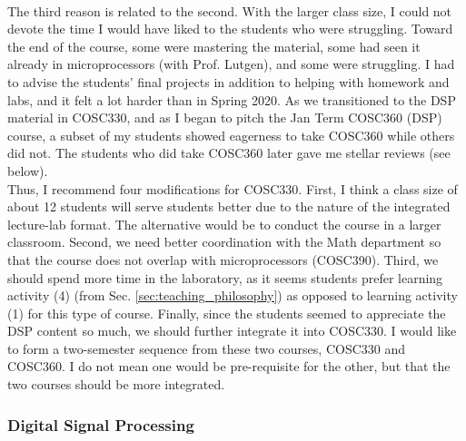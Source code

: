 \documentclass[../../main.tex]{subfiles}
\begin{document}
\\
\vspace{0.15cm}
The third reason is related to the second.  With the larger class size, I could not devote the time I would have liked to the students who were struggling.  Toward the end of the course, some were mastering the material, some had seen it already in microprocessors (with Prof. Lutgen), and some were struggling.  I had to advise the students' final projects in addition to helping with homework and labs, and it felt a lot harder than in Spring 2020.  As we transitioned to the DSP material in COSC330, and as I began to pitch the Jan Term COSC360 (DSP) course, a subset of my students showed eagerness to take COSC360 while others did not.  The students who did take COSC360 later gave me stellar reviews (see below).
\\
\vspace{0.15cm}
Thus, I recommend four modifications for COSC330.  First, I think a class size of about 12 students will serve students better due to the nature of the integrated lecture-lab format.  The alternative would be to conduct the course in a larger classroom.  Second, we need better coordination with the Math department so that the course does not overlap with microprocessors (COSC390).  Third, we should spend more time in the laboratory, as it seems students prefer learning activity (4) (from Sec. \ref{sec:teaching_philosophy}) as opposed to learning activity (1) for this type of course.  Finally, since the students seemed to appreciate the DSP content so much, we should further integrate it into COSC330.  I would like to form a two-semester sequence from these two courses, COSC330 and COSC360.  I do not mean one would be pre-requisite for the other, but that the two courses should be more integrated.

\subsubsection{Digital Signal Processing}
\end{document}
